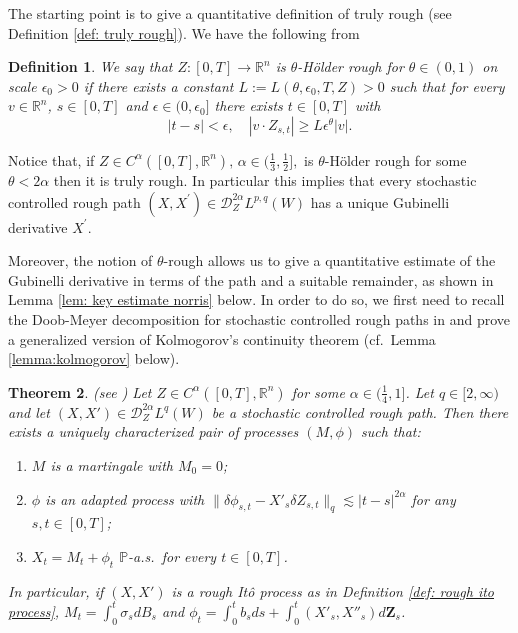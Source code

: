 \documentclass[11pt,a4paper]{article}
\newcommand{\R}{\mathbb{R}}
\newtheorem{defn}{Definition}[section]
\theoremstyle{plain}
\newtheorem{thm}[defn]{Theorem}
\begin{document}
The starting point is to give a quantitative definition of truly rough (see Definition \ref{def: truly rough}). We have the following from \cite[Definition 6.7]{FH20}

\begin{defn}
    \label{def: theta hoelder rough}
    We say that { $Z:[0,T] \to \R^n$}
    is $\theta$-H\"older rough for $\theta \in (0,1)$ on scale $\epsilon_0 > 0$ if there exists a constant $L:=L(\theta,\epsilon_0,T,Z) > 0$ such that for every $v\in \R^n$, $s\in [0,T]$ and $\epsilon\in (0,\epsilon_0]$ there exists $t\in [0,T]$ with
    \begin{equation*}
        |t-s| < \epsilon,
        \quad
        |v\cdot Z_{s,t}|
        \geq L\epsilon^{\theta} |v|.
    \end{equation*}
\end{defn}

    Notice that, if ${Z} \in {C}^{\alpha}([0,T],\R^n), \, \alpha \in (\frac13, \frac12],$ is $\theta$-H\"older rough for some $\theta < 2\alpha$ then it is truly rough. In particular this implies that every stochastic controlled rough path $(X,X^{\prime}) \in \mathscr{D}_{{Z}}^{2\alpha}L^{p,q}(W)$ has a unique Gubinelli derivative $X^{\prime}$.

    Moreover, the notion of $\theta$-rough allows us to give a quantitative estimate of the Gubinelli derivative in terms of the path and {a suitable} remainder, as shown in Lemma \ref{lem: key estimate norris} below.
    {
    In order to do so, we first need to recall the Doob-Meyer decomposition for stochastic controlled rough paths in \cite[Theorem 3.3]{FHL21} and prove a generalized version of Kolmogorov's continuity theorem (cf.\ Lemma \ref{lemma:kolmogorov} below).
    }

    \begin{thm}\label{thm:DoobMeyerdecomposition}
        (see \cite[Theorem 3.3]{FHL21}) 
        Let $Z \in C^\alpha([0,T],\R^n)$ for some $\alpha \in (\frac14,1]$.
        Let $q \in [2,\infty)$ and let $(X, X') \in \mathscr{D}_Z^{2 \alpha} L^q(W)$ be a stochastic controlled rough path. 
        Then there exists a uniquely characterized pair of processes $(M, \phi)$ such that:
        \begin{enumerate} \renewcommand{\labelenumi}{\roman{enumi}.}
            \item $M$ is a martingale with $M_0 = 0$;
            \item $\phi$ is an adapted process with $\| \delta \phi_{s, t} - X'_s    \delta Z_{s, t} \|_q \lesssim | t - s |^{2 \alpha}$ for any $s,t \in [0,T]$;
            \item $X_t = M_t + \phi_t$ $\mathbb{P}$-a.s.\ for every $t \in [0,T]$.
        \end{enumerate}
        In particular, if $(X,X')$ is a rough It\^o process as in Definition \ref{def: rough ito process}, $M_t = \int_0^t \sigma_s dB_s$ and $\phi_t = \int_0^t b_s ds + \int_0^t (X'_s,X''_s) d\mathbf{Z}_s$. 
    \end{thm}
\end{document}
